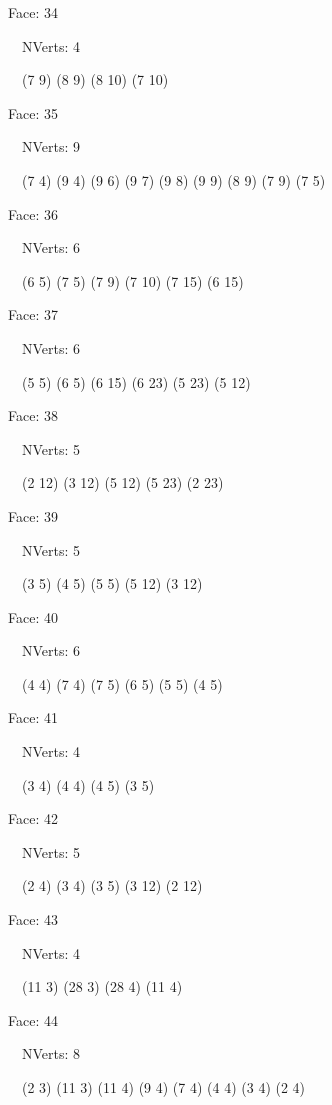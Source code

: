 \documentclass{article}
\begin{document}
{\footnotesize 

Face: 34

\   \    NVerts: 4

 \   \   (7 9) (8 9) (8 10) (7 10)}

{\footnotesize 

Face: 35

\   \    NVerts: 9

 \   \   (7 4) (9 4) (9 6) (9 7) (9 8) (9 9) (8 9) (7 9) (7 5)}

{\footnotesize 

Face: 36

\   \    NVerts: 6

 \   \   (6 5) (7 5) (7 9) (7 10) (7 15) (6 15)}

{\footnotesize 

Face: 37

\   \    NVerts: 6

 \   \   (5 5) (6 5) (6 15) (6 23) (5 23) (5 12)}

{\footnotesize 

Face: 38

\   \    NVerts: 5

 \   \   (2 12) (3 12) (5 12) (5 23) (2 23)}

{\footnotesize 

Face: 39

\   \    NVerts: 5

 \   \   (3 5) (4 5) (5 5) (5 12) (3 12)}

{\footnotesize 

Face: 40

\   \    NVerts: 6

 \   \   (4 4) (7 4) (7 5) (6 5) (5 5) (4 5)}

{\footnotesize 

Face: 41

\   \    NVerts: 4

 \   \   (3 4) (4 4) (4 5) (3 5)}

{\footnotesize 

Face: 42

\   \    NVerts: 5

 \   \   (2 4) (3 4) (3 5) (3 12) (2 12)}

{\footnotesize 

Face: 43

\   \    NVerts: 4

 \   \   (11 3) (28 3) (28 4) (11 4)}

{\footnotesize 

Face: 44

\   \    NVerts: 8

 \   \   (2 3) (11 3) (11 4) (9 4) (7 4) (4 4) (3 4) (2 4)}
\end{document}

